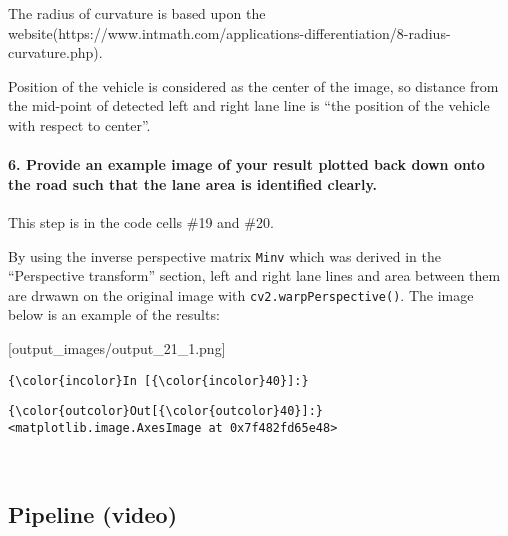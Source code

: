 \documentclass[11pt]{article}
\begin{document}
The radius of curvature is based upon the
website(https://www.intmath.com/applications-differentiation/8-radius-curvature.php).

Position of the vehicle is considered as the center of the image, so
distance from the mid-point of detected left and right lane line is
``the position of the vehicle with respect to center''.

    \hypertarget{provide-an-example-image-of-your-result-plotted-back-down-onto-the-road-such-that-the-lane-area-is-identified-clearly.}{%
\paragraph{6. Provide an example image of your result plotted back down
onto the road such that the lane area is identified
clearly.}\label{provide-an-example-image-of-your-result-plotted-back-down-onto-the-road-such-that-the-lane-area-is-identified-clearly.}}

This step is in the code cells \#19 and \#20.

By using the inverse perspective matrix \texttt{Minv} which was derived
in the ``Perspective transform'' section, left and right lane lines and
area between them are drwawn on the original image with
\texttt{cv2.warpPerspective()}. The image below is an example of the
results:

{[}output\_images/output\_21\_1.png{]}

    \begin{Verbatim}[commandchars=\\\{\}]
{\color{incolor}In [{\color{incolor}40}]:} 
\end{Verbatim}


\begin{Verbatim}[commandchars=\\\{\}]
{\color{outcolor}Out[{\color{outcolor}40}]:} <matplotlib.image.AxesImage at 0x7f482fd65e48>
\end{Verbatim}
            
    \begin{center}
    \end{center}
    { \hspace*{\fill} \\}
    
    \hypertarget{pipeline-video}{%
\subsection{Pipeline (video)}\label{pipeline-video}}
\end{document}
